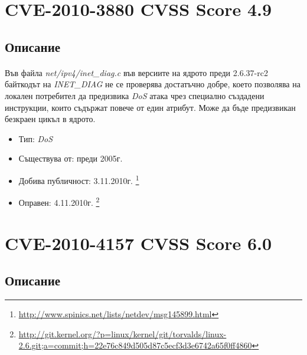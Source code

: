 \documentclass[a4paper,12pt,leqno]{article}
\begin{document}


\section{CVE-2010-3880 CVSS Score 4.9}
\subsection{Описание}
\paragraph{}
Във файла \textit{net/ipv4/inet\_diag.c} във версиите на ядрото преди 2.6.37-rc2 байткодът на \textit{INET\_DIAG} не се проверява достатъчно добре,
което позволява на локален потребител да предизвика \textit{DoS} атака чрез специално създадени инструкции, които съдържат
повече от един атрибут. Може да бъде предизвикан безкраен цикъл в ядрото.
\begin{itemize}
    \item Тип: \textit{DoS}
    \item Съществува от: преди 2005г.
    \item Добива публичност: 3.11.2010г. \footnote{\url{http://www.spinics.net/lists/netdev/msg145899.html}}
    \item Оправен: 4.11.2010г. \footnote{\url{http://git.kernel.org/?p=linux/kernel/git/torvalds/linux-2.6.git;a=commit;h=22e76c849d505d87c5ecf3d3e6742a65f0ff4860}}
\end{itemize}

\section{CVE-2010-4157 CVSS Score 6.0}
\subsection{Описание}
\end{document}
